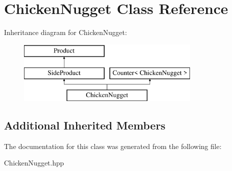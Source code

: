 \hypertarget{class_chicken_nugget}{}\section{Chicken\+Nugget Class Reference}
\label{class_chicken_nugget}
Inheritance diagram for Chicken\+Nugget\+:\begin{figure}[H]
\begin{center}
\leavevmode
\includegraphics[height=3.000000cm]{class_chicken_nugget}
\end{center}
\end{figure}
\subsection*{Additional Inherited Members}


The documentation for this class was generated from the following file\+:\begin{DoxyCompactItemize}
\item 
Chicken\+Nugget.\+hpp\end{DoxyCompactItemize}
